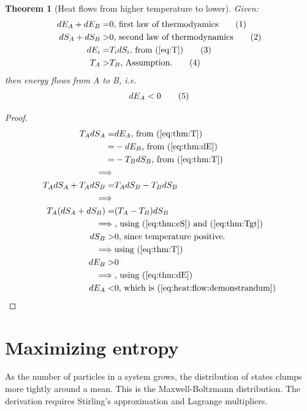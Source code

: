 \documentclass[]{article}
\newcommand\numberthis{\addtocounter{equation}{1}\tag{\theequation}}
\newtheorem{thm}{Theorem}
\begin{document}
\begin{thm}[Heat flows from higher temperature to lower]\label{thm:heat:flow}
	Given:
	\begin{align*}
	dE_A + dE_B =& 0 \text{, first law of thermodyamics}\numberthis \label{eq:thm:dE}\\
	dS_A + dS_B>& 0 \text{, second law of thermodynamics}\numberthis \label{eq:thm:eS} \\
	dE_i =& T_i dS_i \text{, from (\ref {eq:T})} \numberthis \label{eq:thm:T} \\
	T_A>&T_B \text{, Assumption.}\numberthis \label{eq:thm:Tgt}
	\end{align*}
	then energy flows from A to B, i.e.
	\begin{align*}
	dE_A<0\numberthis \label{eq:heat:flow:demonstrandum}
	\end{align*}
\end{thm}
\begin{proof}
	\begin{align*}
	T_A dS_A =& dE_A \text{, from (\ref{eq:thm:T})}\\
	=& - dE_B \text{, from (\ref{eq:thm:dE})}\\
	=& - T_B dS_B  \text{, from (\ref{eq:thm:T})}\\
	\implies&\\
	T_A dS_A + T_A dS_B =& T_A dS_B -T_B dS_B\\
	\implies&\\
	T_A (dS_A + dS_B) =& (T_A  -T_B) dS_B\\
	\implies& \text{, using (\ref{eq:thm:eS}) and (\ref{eq:thm:Tgt})}\\
	dS_B >& 0\text{, since temperature positive.}\\
	\implies& \text{using (\ref{eq:thm:T})}\\
	dE_B >& 0\\
	\implies& \text{, using (\ref{eq:thm:dE})}\\
	dE_A<&0\text{, which is (\ref{eq:heat:flow:demonstrandum})}
	\end{align*}
\end{proof}


\section{Maximizing entropy}

As the number of particles in a system grows, the distribution of states clumps more tightly around a mean. This is the Maxwell-Boltzmann distribution. The derivation requires Stirling's approximation and Lagrange multipliers.
\end{document}
